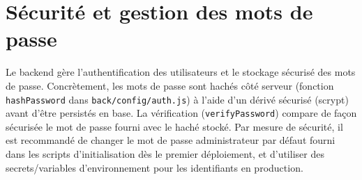 \section{Sécurité et gestion des mots de passe}
Le backend gère l'authentification des utilisateurs et le stockage sécurisé des mots de passe. Concrètement, les mots de passe sont hachés côté serveur (fonction \texttt{hashPassword} dans \texttt{back/config/auth.js}) à l'aide d'un dérivé sécurisé (scrypt) avant d'être persistés en base. La vérification (\texttt{verifyPassword}) compare de façon sécurisée le mot de passe fourni avec le haché stocké. Par mesure de sécurité, il est recommandé de changer le mot de passe administrateur par défaut fourni dans les scripts d'initialisation dès le premier déploiement, et d'utiliser des secrets/variables d'environnement pour les identifiants en production.
